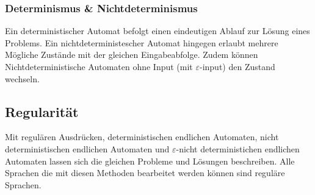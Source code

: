 \documentclass{article}
\begin{document}
\subsubsection{Determinismus \& Nichtdeterminismus}
Ein deterministischer Automat befolgt einen eindeutigen Ablauf zur Lösung eines Problems. Ein nichtdeterministescher Automat hingegen erlaubt mehrere Mögliche Zustände mit der gleichen Eingabeabfolge. Zudem können Nichtdeterministische Automaten ohne Input (mit $\varepsilon$-input) den Zustand wechseln.

\subsection{Regularität}
Mit regulären Ausdrücken, deterministischen endlichen Automaten, nicht deterministischen endlichen Automaten und $\varepsilon$-nicht deterministichen endlichen Automaten lassen sich die gleichen Probleme und Lösungen beschreiben. Alle Sprachen die mit diesen Methoden bearbeitet werden können sind reguläre Sprachen.
\end{document}
